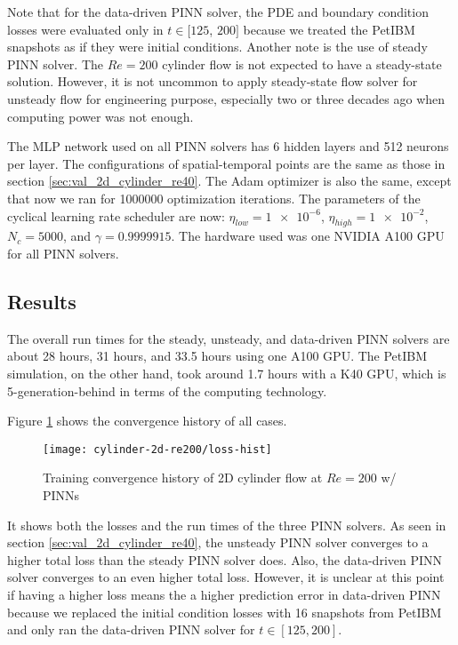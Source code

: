 Note that for the data-driven PINN solver, the PDE and boundary condition losses were evaluated only in $t\in[125$, $200]$ because we treated the PetIBM snapshots as if they were initial conditions.
Another note is the use of steady PINN solver.
The $Re=200$ cylinder flow is not expected to have a steady-state solution.
However, it is not uncommon to apply steady-state flow solver for unsteady flow for engineering purpose, especially two or three decades ago when computing power was not enough.

The MLP network used on all PINN solvers has 6 hidden layers and 512 neurons per layer.
The configurations of spatial-temporal points are the same as those in section \ref{sec:val_2d_cylinder_re40}.
The Adam optimizer is also the same, except that now we ran for \num{1000000} optimization iterations.
The parameters of the cyclical learning rate scheduler are now: $\eta_{low}=\num{1e-6}$, $\eta_{high}=\num{1e-2}$, $N_c=5000$, and $\gamma=\num{0.9999915}$.
The hardware used was one NVIDIA A100 GPU for all PINN solvers.

\subsection{Results}\label{sec:cylinder-re200-results}

The overall run times for the steady, unsteady, and data-driven PINN solvers are about 28 hours, 31 hours, and 33.5 hours using one A100 GPU.
The PetIBM simulation, on the other hand, took around 1.7 hours with a K40 GPU, which is 5-generation-behind in terms of the computing technology.

Figure \ref{fig:cylinder-re200-pinn-loss} shows the convergence history of all cases.
\begin{figure}
    \centering%
    \texttt{[image: cylinder-2d-re200/loss-hist]}%
    \caption{%
        Training convergence history of 2D cylinder flow at $Re=\num{200}$ w/ PINNs
    }
    \label{fig:cylinder-re200-pinn-loss}%
\end{figure}
It shows both the losses and the run times of the three PINN solvers.
As seen in section \ref{sec:val_2d_cylinder_re40}, the unsteady PINN solver converges to a higher total loss than the steady PINN solver does.
Also, the data-driven PINN solver converges to an even higher total loss.
However, it is unclear at this point if having a higher loss means the a higher prediction error in data-driven PINN because we replaced the initial condition losses with 16 snapshots from PetIBM and only ran the data-driven PINN solver for $t\in[125, 200]$.


